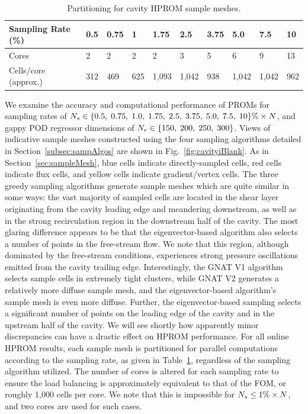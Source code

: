 \begin{table}
	\centering
	\begin{tabular}{ llllllllll }
	\toprule
	Sampling Rate (\%) & 0.5 & 0.75 & 1 & 1.75 & 2.5 & 3.75 & 5.0 & 7.5 & 10 \\
	\midrule
	Cores & 2 & 2 & 2 & 2 & 3 & 5 & 6 & 9 & 13 \\
	Cells/core (approx.) & 312 & 469 & 625 & 1,093 & 1,042 & 938 & 1,042 & 1,042 & 962 \\
	\bottomrule
	\end{tabular}
	\caption{\label{tab:cavitySampProcs}Partitioning for cavity HPROM sample meshes.}
\end{table}

We examine the accuracy and computational performance of PROMs for sampling rates of $N_s \in \{0.5, \; 0.75, \; 1.0, \; 1.75, \; 2.5, \; 3.75, \; 5.0, \; 7.5, \; 10\}\% \times N$, and gappy POD regressor dimensions of $N_r \in \{150, \; 200, \; 250, \; 300\}$. Views of indicative sample meshes constructed using the four sampling algorithms detailed in Section~\ref{subsec:sampAlgos} are shown in Fig.~\ref{fig:cavityiBlank}. As in Section~\ref{sec:sampleMesh}, blue cells indicate directly-sampled cells, red cells indicate flux cells, and yellow cells indicate gradient/vertex cells. The three greedy sampling algorithms generate sample meshes which are quite similar in some ways: the vast majority of sampled cells are located in the shear layer originating from the cavity leading edge and meandering downstream, as well as in the strong recirculation region in the downstream half of the cavity. The most glaring difference appears to be that the eigenvector-based algorithm also selects a number of points in the free-stream flow. We note that this region, although dominated by the free-stream conditions, experiences strong pressure oscillations emitted from the cavity trailing edge. Interestingly, the GNAT V1 algorithm selects sample cells in extremely tight clusters, while GNAT V2 generates a relatively more diffuse sample mesh, and the eigenvector-based algorithm's sample mesh is even more diffuse. Further, the eigenvector-based sampling selects a significant number of points on the leading edge of the cavity and in the upstream half of the cavity. We will see shortly how apparently minor discrepancies can have a drastic effect on HPROM performance. For all online HPROM results, each sample mesh is partitioned for parallel computations according to the sampling rate, as given in Table~\ref{tab:cavitySampProcs}, regardless of the sampling algorithm utilized. The number of cores is altered for each sampling rate to ensure the load balancing is approximately equivalent to that of the FOM, or roughly 1,000 cells per core. We note that this is impossible for $N_s \le 1\% \times N$, and two cores are used for such cases.

